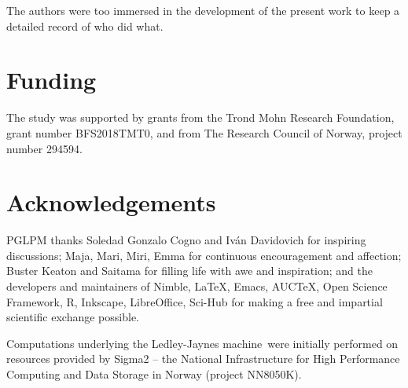 \documentclass[utf8]{FrontiersinHarvard} %
\providecommand{\href}[2]{#2}
\renewcommand*{\|}[1][]{\nonscript\:#1\vert\nonscript\:\mathopen{}}
\newcommand*{\ljm}{Ledley-Jaynes machine}
\begin{document}
The authors were too immersed in the development of the present work to keep a detailed record of who did what.


\section*{Funding}
The study was supported by grants from the Trond Mohn Research Foundation, grant number BFS2018TMT0, and from The Research Council of Norway, project number 294594.

\section*{Acknowledgements}
PGLPM thanks Soledad Gonzalo Cogno and Iv\'an Davidovich for inspiring discussions;
Maja, Mari, Miri, Emma for continuous encouragement and affection; Buster Keaton and Saitama for filling life with awe and inspiration; and the developers and maintainers of Nimble, \LaTeX, Emacs, AUC\TeX, Open Science Framework, R, Inkscape, LibreOffice, Sci-Hub for making a free and impartial scientific exchange possible.

Computations underlying the \ljm\ were initially performed on resources provided by Sigma2 -- the National Infrastructure for High Performance Computing and Data Storage in Norway (project NN8050K).
\end{document}
